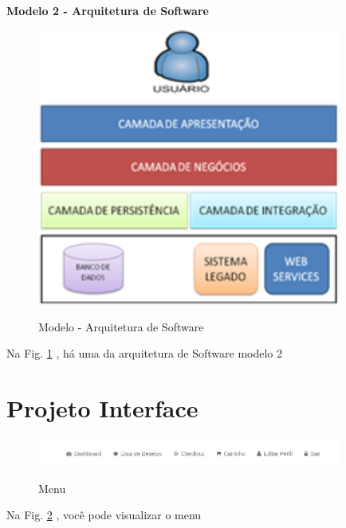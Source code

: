                
                     \textbf{Modelo 2 - Arquitetura de Software }  
                
                
                  \begin{figure}[H]
                 \caption{Modelo - Arquitetura de Software}
               \centering %
                \includegraphics[width=10cm]{analisedeProjeto/arSoft2} %
                \label{figura:arSoft2}
                \end{figure}
                Na Fig. \ref{figura:arSoft2} , há uma da arquitetura de Software modelo 2
                
                
                
                
                
                
                
                \section{Projeto Interface}
                
                 
               \begin{figure}[H]
                 \caption{Menu}
               \centering %
                \includegraphics[width=10cm]{analisedeProjeto/menu} %
                \label{figura:menu}
                \end{figure}
                Na Fig. \ref{figura:menu} ,  você pode visualizar o menu
                
